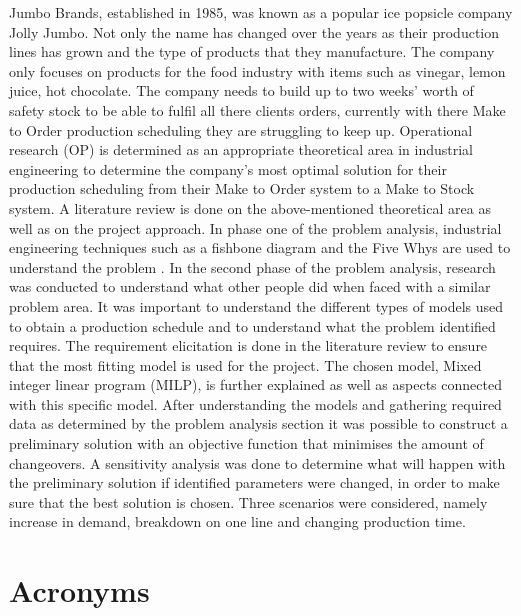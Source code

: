 \documentclass[a4paper,11pt,fleqn]{report}
\begin{document}
Jumbo Brands, established in 1985, was known as a popular ice popsicle company Jolly Jumbo. Not only the name has changed over the years as their production lines has grown and the type of products that they manufacture. The company only focuses on products for the food industry with items such as vinegar, lemon juice, hot chocolate. The company needs to build up to two weeks’ worth of safety stock to be able to fulfil all there clients orders, currently with there Make to Order production scheduling they are struggling to keep up. Operational research (OP) is determined as an appropriate theoretical area in industrial engineering to determine the company’s most optimal solution for their production scheduling from their Make to Order system to a Make to Stock system. A literature review is done on the above-mentioned theoretical area as well as on the project approach. In phase one of the problem analysis, industrial engineering techniques such as a fishbone diagram and the Five Whys are used to understand the problem . In the second phase of the problem analysis, research was conducted to understand what other people did when faced with a similar problem area. It was important to understand the different types of models used to obtain a production schedule and to understand what the problem identified requires. The requirement elicitation is done in the literature review to ensure that the most fitting model is used for the project. The chosen model, Mixed integer linear program (MILP), is further explained as well as aspects connected with this specific model. After understanding the models and gathering required data as determined by the problem analysis section it was possible to construct a preliminary solution with an objective function that minimises the amount of changeovers. A sensitivity analysis was done to determine what will happen with the preliminary solution if identified parameters were changed, in order to make sure that the best solution is chosen. Three scenarios were considered, namely increase in demand, breakdown on one line and changing production time.

\tableofcontents
\chapter*{Acronyms}
\begin{acronym}[ABCDEF]
    
\end{acronym}
\end{document}
